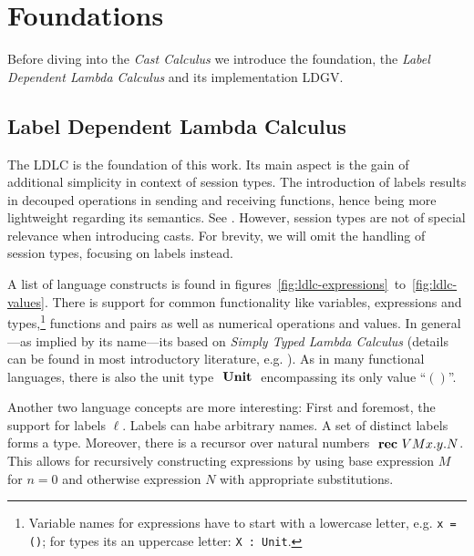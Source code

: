 \chapter{Foundations}\label{chap:foundations}

Before diving into the \emph{Cast Calculus} we introduce the foundation, the \emph{Label Dependent Lambda Calculus} and its implementation LDGV.

\section{Label Dependent Lambda Calculus}\label{sec:ldlc}

The LDLC is the foundation of this work. Its main aspect is the gain of additional simplicity in context of session types. The introduction of labels results in decouped operations in sending and receiving functions, hence being more lightweight regarding its semantics. See \cite{thiemann2019}. However, session types are not of special relevance when introducing casts. For brevity, we will omit the handling of session types, focusing on labels instead.

A list of language constructs is found in figures~\ref{fig:ldlc-expressions}~to~\ref{fig:ldlc-values}. There is support for common functionality like variables, expressions and types,\footnote{
Variable names for expressions have to start with a lowercase letter, e.g. \texttt{\valb x = ()}; for types its an uppercase letter: \texttt{\typeb X : Unit}.} functions and pairs as well as numerical operations and values. In general---as implied by its name---its based on \emph{Simply Typed Lambda Calculus} (details can be found in most introductory literature, e.g. \cite{pierce2002}). As in many functional languages, there is also the unit type $\text{ \textbf{Unit} }$ encompassing its only value ``$()$''.

Another two language concepts are more interesting: First and foremost, the support for labels $\ell$. Labels can habe arbitrary names. A set of distinct labels forms a type. Moreover, there is a recursor over natural numbers $\text{ \textbf{rec} } V M x.y.N$. This allows for recursively constructing expressions by using base expression $M$ for $n=0$ and otherwise expression $N$ with appropriate substitutions.

